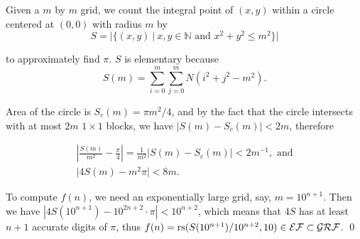 
\begin{pf} \rm
 Given a $m$ by $m$ grid, we count the integral point of $(x,y)$
 within a circle centered at $(0, 0)$ with radius $m$ by 
\[
 S = \Big| \{ (x, y) ~|~ x,y\in\mathbb{N}\textrm{ and }x^2 + y^2 \leq m^2 \} \Big|
\]

\noindent to approximately find $\pi$. $S$ is elementary because
\[
 S(m) = \sum_{i=0}^{m} \sum_{j=0}^{m} N(i^2 + j^2 - m^2).
\]

\noindent Area of the circle is $S_c(m) = \pi m^2 / 4$, 
and by the fact that the circle intersects with at most $2m$ $1\times 1$ blocks,
we have $|S(m)-S_c(m)|<2m$, therefore

\[
\begin{array}{c}
 \displaystyle
   \left| 
   \frac{S(m)}{m^2} - \frac{\pi}{4}
   \right| = \frac{1}{m^2} |S(m) - S_c(m)| < 2 m^{-1}, \textrm{ and}\\
 \displaystyle
 \big| 4S(m) - m^2 \pi\big| < 8m.
\end{array}
\]

To compute $f(n)$, we need an exponentially large grid, say, $m=10^{n+1}$.
Then we have $|4S(10^{n+1}) - 10^{2n+2}\cdot\pi| < 10^{n+2}$,
which means that $4S$ has at least 
$n+1$ accurate digits of $\pi$, thus
$f(n) = \mathrm{rs}( S(10^{n+1}) / 10^{n+2} , 10) \in\mathcal{EF}\subset\mathcal{GRF}$. 
\qed
\end{pf}

